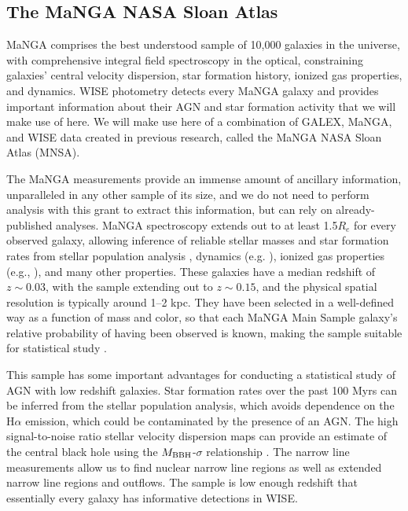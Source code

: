 \documentclass[12pt, preprint]{hacked-aastex}
\begin{document}
\subsection{The MaNGA NASA Sloan Atlas}
\label{sec:mnsa}

MaNGA comprises the best understood sample of 10,000 galaxies in the universe, 
with comprehensive integral field spectroscopy in the  optical, constraining 
galaxies' central velocity dispersion, star formation history, ionized gas properties,
and dynamics. WISE photometry detects every MaNGA galaxy and provides important 
information about their AGN and star formation activity that we will make use of
here. We will make use here of a combination of GALEX, MaNGA, and WISE 
data created in previous research, called the MaNGA NASA Sloan Atlas (MNSA).

The MaNGA measurements provide an immense amount of ancillary
information, unparalleled in any other sample of its size, and we do
not need to perform analysis with this grant to extract this
information, but can rely on already-published analyses.  MaNGA
spectroscopy extends out to at least 1.5$R_e$ for every observed
galaxy, allowing inference of reliable stellar masses and star
formation rates from stellar population analysis \cite{sanchez22a},
dynamics (e.g. \cite{graham18a}), ionized gas properties (e.g.,
\cite{belfiore17a}), and many other properties.  These galaxies have a
median redshift of $z\sim0.03$, with the sample extending out to
$z\sim 0.15$, and the physical spatial resolution is typically around
1--2 kpc. They have been selected in a well-defined way as a function
of mass and color, so that each MaNGA Main Sample galaxy's relative
probability of having been observed is known, making the sample
suitable for statistical study \cite{wake17a}.

This sample has some important advantages for conducting a statistical
study of AGN with low redshift galaxies.  Star formation rates over
the past 100 Myrs can be inferred from the stellar population
analysis, which avoids dependence on the H$\alpha$ emission, which
could be contaminated by the presence of an AGN.  The high
signal-to-noise ratio stellar velocity dispersion maps can provide an
estimate of the central black hole using the $M_{\rm BBH}$-$\sigma$
relationship \cite{kormendy04b}. The narrow line measurements allow us
to find nuclear narrow line regions as well as extended narrow line
regions and outflows. The sample is low enough redshift that
essentially every galaxy has informative detections in WISE.
\end{document}
